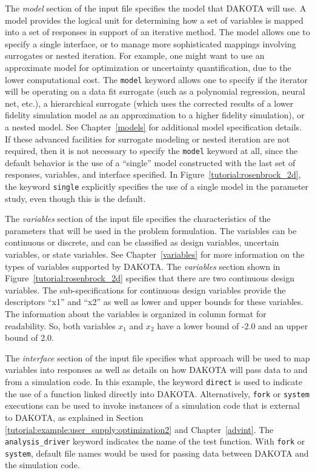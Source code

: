 The \emph{model} section of the input file specifies the model that
DAKOTA will use.  A model provides the logical unit for determining
how a set of variables is mapped into a set of responses in support of
an iterative method.  The model allows one to specify a single
interface, or to manage more sophisticated mappings involving
surrogates or nested iteration.  For example, one might want to use
an approximate model for optimization or uncertainty quantification,
due to the lower computational cost.  The
\texttt{model} keyword allows one to specify if the iterator will be
operating on a data fit surrogate (such as a polynomial regression,
neural net, etc.), a hierarchical surrogate (which uses the corrected
results of a lower fidelity simulation model as an approximation to a
higher fidelity simulation), or a nested model. See
Chapter~\ref{models} for additional model specification details. If
these advanced facilities for surrogate modeling or nested iteration
are not required, then it is not necessary to specify the
\texttt{model} keyword at all, since the default behavior is the use
of a ``single'' model constructed with the last set of responses,
variables, and interface specified.  In
Figure~\ref{tutorial:rosenbrock_2d}, the keyword \texttt{single}
explicitly specifies the use of a single model in the parameter study,
even though this is the default.

The \emph{variables} section of the input file specifies the
characteristics of the parameters that will be used in the problem
formulation. The variables can be continuous or discrete, and can be
classified as design variables, uncertain variables, or state
variables. See Chapter~\ref{variables} for more information on the
types of variables supported by DAKOTA.  The \emph{variables} section
shown in Figure~\ref{tutorial:rosenbrock_2d} specifies that there are
two continuous design variables.  The sub-specifications for
continuous design variables
provide the descriptors ``x1'' and ``x2'' as well as lower
and upper bounds for these variables. The information about the
variables is organized in column format for readability. So, both
variables $x_1$ and $x_2$ have a lower bound of -2.0 and an upper
bound of 2.0.

The \emph{interface} section of the input file specifies what approach
will be used to map variables into responses as well as details on how
DAKOTA will pass data to and from a simulation code.
In this example, the keyword \texttt{direct} is used to indicate the
use of a function linked directly into DAKOTA.
Alternatively, \texttt{fork} or \texttt{system} executions can be used
to invoke instances of a simulation code that is external to DAKOTA,
as explained in Section \ref{tutorial:example:user_supply:optimization2} 
and Chapter~\ref{advint}.
The \texttt{analysis\_driver} keyword indicates the name of the test
function.  With \texttt{fork} or \texttt{system}, default file names
would be used for passing data between DAKOTA and the simulation code.

